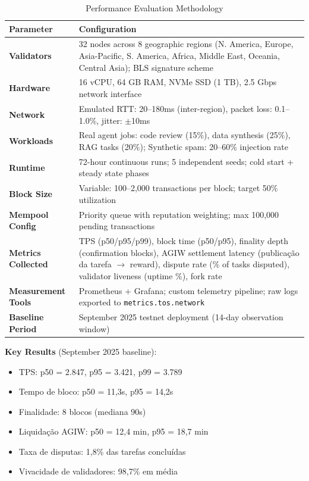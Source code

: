 \documentclass[11pt]{article}
\begin{document}
\begin{itemize}[noitemsep]
\begin{itemize}[noitemsep]
\begin{itemize}[noitemsep]
\begin{table}[H]
\centering
\caption{Performance Evaluation Methodology}
\label{tab:evaluation-methodology}
\begin{tabular}{@{}p{}p{}@{}}
\toprule
\textbf{Parameter} & \textbf{Configuration} \\ \midrule
\textbf{Validators} & 32 nodes across 8 geographic regions (N. America, Europe, Asia-Pacific, S. America, Africa, Middle East, Oceania, Central Asia); BLS signature scheme \\
\textbf{Hardware} & 16 vCPU, 64 GB RAM, NVMe SSD (1 TB), 2.5 Gbps network interface \\
\textbf{Network} & Emulated RTT: 20--180ms (inter-region), packet loss: 0.1--1.0\%, jitter: $\pm$10ms \\
\textbf{Workloads} & Real agent jobs: code review (15\%), data synthesis (25\%), RAG tasks (20\%); Synthetic spam: 20--60\% injection rate \\
\textbf{Runtime} & 72-hour continuous runs; 5 independent seeds; cold start + steady state phases \\
\textbf{Block Size} & Variable: 100--2,000 transactions per block; target 50\% utilization \\
\textbf{Mempool Config} & Priority queue with reputation weighting; max 100,000 pending transactions \\
\textbf{Metrics Collected} & TPS (p50/p95/p99), block time (p50/p95), finality depth (confirmation blocks), AGIW settlement latency (publicação da tarefa $\rightarrow$ reward), dispute rate (\% of tasks disputed), validator liveness (uptime \%), fork rate \\
\textbf{Measurement Tools} & Prometheus + Grafana; custom telemetry pipeline; raw logs exported to \texttt{metrics.tos.network} \\
\textbf{Baseline Period} & September 2025 testnet deployment (14-day observation window) \\
\bottomrule
\end{tabular}
\end{table}

\textbf{Key Results} (September 2025 baseline):
\begin{itemize}[noitemsep]
  \item TPS: p50 = 2.847, p95 = 3.421, p99 = 3.789
  \item Tempo de bloco: p50 = 11,3s, p95 = 14,2s
  \item Finalidade: 8 blocos (mediana 90s)
  \item Liquidação AGIW: p50 = 12,4 min, p95 = 18,7 min
  \item Taxa de disputas: 1,8\% das tarefas concluídas
  \item Vivacidade de validadores: 98,7\% em média
\end{itemize}


\end{itemize}
\end{itemize}
\end{itemize}
\end{document}

